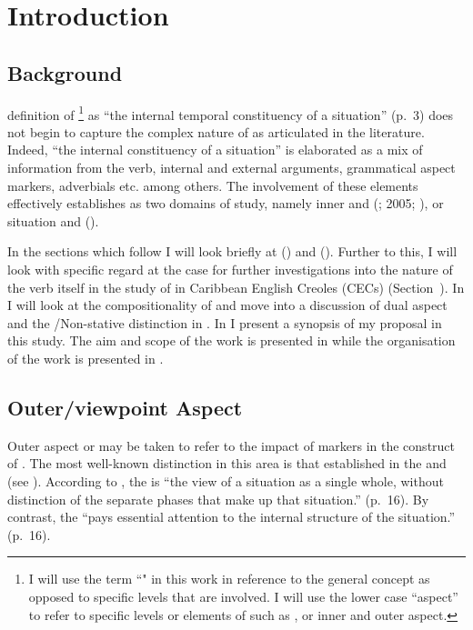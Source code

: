 
\chapter{Introduction}\label{ch:1}
\section{Background}\label{sec:1}

 definition of \footnote{I will use the term ``"
in this work in reference to the general concept as opposed to specific levels
that are involved.  I will use the lower case ``aspect'' to refer to specific
levels or elements of  such as , or inner and outer
aspect.} as ``the internal temporal constituency of a situation'' (p.~3) does not
begin to capture the complex nature of  as articulated in the literature.
Indeed,  ``the internal constituency of a situation'' is elaborated as a
mix of information from the verb, internal and external arguments, grammatical
aspect markers, adverbials etc.
\citep[cf.][]{Klein1994,Krifka1998,Jackendoff1996,MacDonald2008,Mourelatos1981,Ramchand2008,Rothstein2004,Tenny1994,TennyPustejovsky2000,Verkuyl1993,Verkuyl1993,Verkuyl1999}
among others.  The involvement of these elements effectively establishes 
as two domains of study, namely inner and  (\citealt{Travis1991};
2005; \citealt{Verkuyl1993}), or situation and 
(\citealt{Smith1983,Smith1991}).

In the sections which follow I will look briefly at 
() and  ().  Further to this, I
will look with specific regard at the case for further investigations into the
nature of the verb itself in the study of  in Caribbean English Creoles
(CECs) (Section~).  In  I will look at the
compositionality of  and move into a discussion of dual aspect and the
\slash Non-stative distinction in .  In  I
present a synopsis of my proposal in this study.  The aim and scope of the work
is presented in  while the organisation of the work is
presented in .

\section{Outer/viewpoint Aspect}\label{sec:1.1}\largerpage
Outer aspect or  may be taken to refer to the impact of
 markers in the construct of .  The most
well-known distinction in this area is that established in the  and
 (see \citealt{Comrie1976}).  According to \citet{Comrie1976}, the
 is ``the view of a situation as a single whole, without distinction of
the separate phases that make up that situation.'' (p.~16).  By contrast, the
 ``pays essential attention to the internal structure of the
situation.'' (p.~16).


